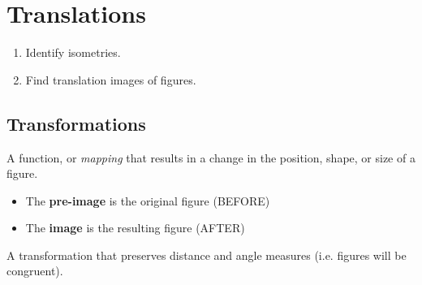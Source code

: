 \documentclass{article}
\begin{document}
\section*{Translations}

\begin{tcolorbox}[colframe=orange!70!white, coltitle=black, title=\textbf{Today I Can}]
\begin{enumerate}
    \item Identify isometries.
    \item Find translation images of figures.
\end{enumerate}
\end{tcolorbox}
\smallskip 

\subsection*{Transformations}

\begin{tcolorbox}[colframe=black!20!white, opacitybacktitle=0.1, coltitle=black, title=\textbf{Transformation}]
A function, or \emph{mapping} that results in a change in the position, shape, or size of a figure.

\begin{itemize}
    \item The \textbf{pre-image} is the original figure (BEFORE)
    \item The \textbf{image} is the resulting figure (AFTER)
\end{itemize}
\end{tcolorbox}

\begin{tcolorbox}[colframe=black!20!white, opacitybacktitle=0.1, coltitle=black, title=\textbf{Rigid Motion}]
A transformation that preserves distance and angle measures (i.e. figures will be congruent).
\end{tcolorbox}
\end{document}

